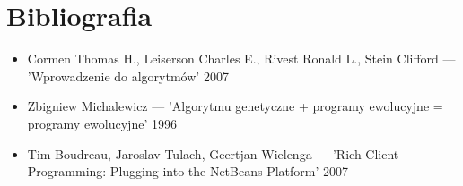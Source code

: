\documentclass[a4paper]{article}
\begin{document}
\section{Bibliografia}
\begin{itemize}
 \item Cormen Thomas H., Leiserson Charles E., Rivest Ronald L., Stein Clifford --- 'Wprowadzenie do algorytmów' 2007
 \item Zbigniew Michalewicz --- 'Algorytmu genetyczne + programy ewolucyjne = programy ewolucyjne' 1996
 \item Tim Boudreau, Jaroslav Tulach, Geertjan Wielenga --- 'Rich Client Programming: Plugging into the NetBeans Platform' 2007
\end{itemize}
\end{document}
